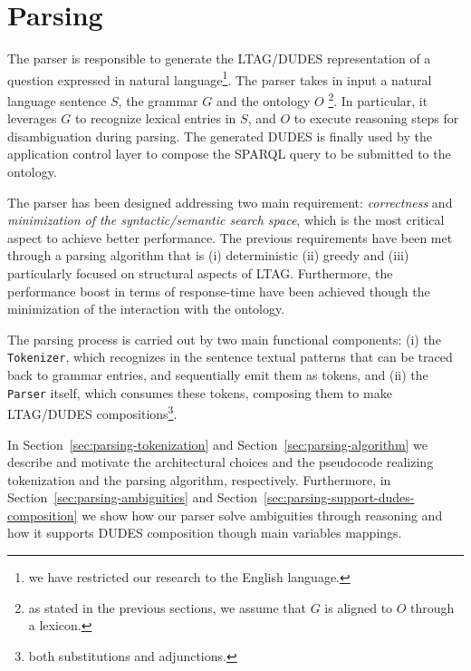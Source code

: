\section{Parsing}
\label{sec:parsing}

The parser is responsible to generate the LTAG/DUDES representation of a question expressed in natural language\footnote{we have restricted our research to the English language.}. 
%
The parser takes in input a natural language sentence $S$, the grammar $G$ and the ontology $O$ \footnote{as stated in the previous sections, we assume that $G$ is aligned to $O$ through a lexicon.}.
%
In particular, it leverages $G$ to recognize lexical entries in $S$, and $O$ to execute reasoning steps for disambiguation during parsing.
%
The generated DUDES is finally used by the application control layer to compose the SPARQL query to be submitted to the ontology.


The parser has been designed addressing two main requirement: \textit{correctness} and \textit{minimization of the syntactic/semantic search space}, which is the most critical aspect to achieve better performance.
%
The previous requirements have been met through a parsing algorithm that is (i) deterministic (ii) greedy and (iii) particularly focused on structural aspects of LTAG.
Furthermore, the performance boost in terms of response-time have been achieved though the minimization of the interaction with the ontology.

The parsing process is carried out by two main functional components: 
(i) the \texttt{Tokenizer}, which recognizes in the sentence textual patterns that can be traced back to grammar entries, and sequentially emit them as tokens, and 
(ii) the \texttt{Parser} itself, which consumes these tokens, composing them to make LTAG/DUDES compositions\footnote{both substitutions and adjunctions.}.

In Section~\ref{sec:parsing-tokenization} and Section~\ref{sec:parsing-algorithm} we describe and motivate the architectural choices and the pseudocode realizing tokenization and the parsing algorithm, respectively.
%
Furthermore, in Section~\ref{sec:parsing-ambiguities} and Section~\ref{sec:parsing-support-dudes-composition} we show how our parser solve ambiguities through reasoning and how it supports DUDES composition though main variables mappings.




